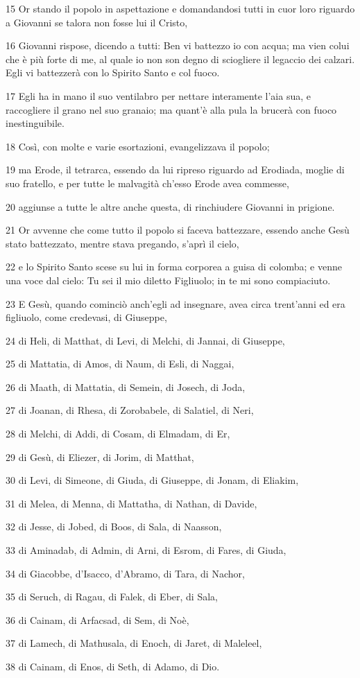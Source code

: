 \par 15 Or stando il popolo in aspettazione e domandandosi tutti in cuor loro riguardo a Giovanni se talora non fosse lui il Cristo,
\par 16 Giovanni rispose, dicendo a tutti: Ben vi battezzo io con acqua; ma vien colui che è più forte di me, al quale io non son degno di sciogliere il legaccio dei calzari. Egli vi battezzerà con lo Spirito Santo e col fuoco.
\par 17 Egli ha in mano il suo ventilabro per nettare interamente l'aia sua, e raccogliere il grano nel suo granaio; ma quant'è alla pula la brucerà con fuoco inestinguibile.
\par 18 Così, con molte e varie esortazioni, evangelizzava il popolo;
\par 19 ma Erode, il tetrarca, essendo da lui ripreso riguardo ad Erodiada, moglie di suo fratello, e per tutte le malvagità ch'esso Erode avea commesse,
\par 20 aggiunse a tutte le altre anche questa, di rinchiudere Giovanni in prigione.
\par 21 Or avvenne che come tutto il popolo si faceva battezzare, essendo anche Gesù stato battezzato, mentre stava pregando, s'aprì il cielo,
\par 22 e lo Spirito Santo scese su lui in forma corporea a guisa di colomba; e venne una voce dal cielo: Tu sei il mio diletto Figliuolo; in te mi sono compiaciuto.
\par 23 E Gesù, quando cominciò anch'egli ad insegnare, avea circa trent'anni ed era figliuolo, come credevasi, di Giuseppe,
\par 24 di Heli, di Matthat, di Levi, di Melchi, di Jannai, di Giuseppe,
\par 25 di Mattatia, di Amos, di Naum, di Esli, di Naggai,
\par 26 di Maath, di Mattatia, di Semein, di Josech, di Joda,
\par 27 di Joanan, di Rhesa, di Zorobabele, di Salatiel, di Neri,
\par 28 di Melchi, di Addi, di Cosam, di Elmadam, di Er,
\par 29 di Gesù, di Eliezer, di Jorim, di Matthat,
\par 30 di Levi, di Simeone, di Giuda, di Giuseppe, di Jonam, di Eliakim,
\par 31 di Melea, di Menna, di Mattatha, di Nathan, di Davide,
\par 32 di Jesse, di Jobed, di Boos, di Sala, di Naasson,
\par 33 di Aminadab, di Admin, di Arni, di Esrom, di Fares, di Giuda,
\par 34 di Giacobbe, d'Isacco, d'Abramo, di Tara, di Nachor,
\par 35 di Seruch, di Ragau, di Falek, di Eber, di Sala,
\par 36 di Cainam, di Arfacsad, di Sem, di Noè,
\par 37 di Lamech, di Mathusala, di Enoch, di Jaret, di Maleleel,
\par 38 di Cainam, di Enos, di Seth, di Adamo, di Dio.

